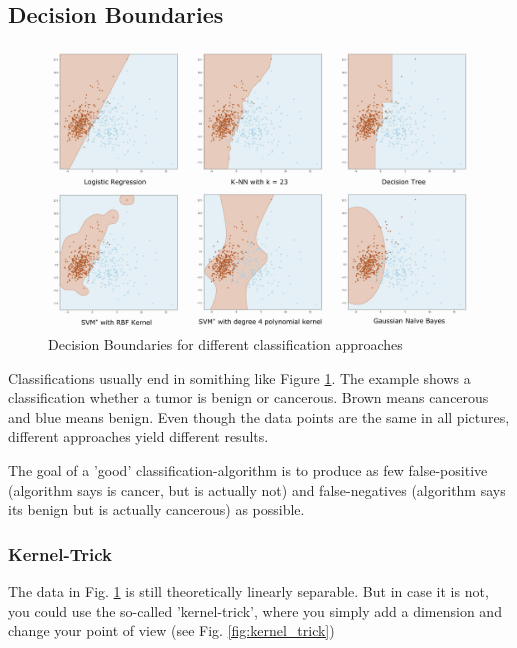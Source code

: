 \documentclass[a4paper, 11pt]{article}
\begin{document}
\subsection{Decision Boundaries}

\begin{figure}[htb!]
    \centering
    \includegraphics[keepaspectratio=true, width=\linewidth]{decision_boundaries.png}
    \caption{Decision Boundaries for different classification approaches}
    \label{fig:decision_boundaries}
\end{figure}

Classifications usually end in somithing like Figure \ref{fig:decision_boundaries}. The example shows a classification whether a tumor is benign or cancerous. Brown means cancerous and blue means benign. Even though the data points are the same in all pictures, different approaches yield different results.

The goal of a 'good' classification-algorithm is to produce as few false-positive (algorithm says is cancer, but is actually not) and false-negatives (algorithm says its benign but is actually cancerous) as possible. 

\subsubsection{Kernel-Trick}
The data in Fig. \ref{fig:decision_boundaries} is still theoretically linearly separable. But in case it is not, you could use the so-called 'kernel-trick', where you simply add a dimension and change your point of view (see Fig. \ref{fig:kernel_trick})
\end{document}
